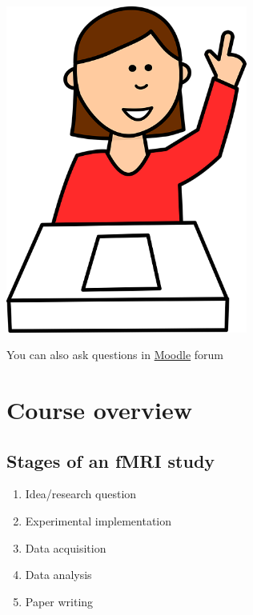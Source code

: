 \documentclass[
  letterpaper,
]{report}
\begin{document}

\includegraphics[width=3.125in,height=\textheight,keepaspectratio]{images/classroom-1297782_640.png}

You can also ask questions in \href{https://moodle.uni-graz.at/}{Moodle}
forum


\chapter*{Course overview}\label{chap-overview}


\section*{Stages of an fMRI study}\label{stages-of-an-fmri-study}


\begin{enumerate}
\def\labelenumi{\arabic{enumi}.}
\item
  Idea/research question
\item
  Experimental implementation
\item
  Data acquisition
\item
  Data analysis
\item
  Paper writing
\end{enumerate}
\end{document}
